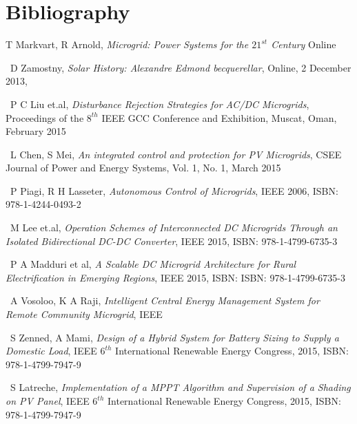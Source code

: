 \documentclass[journal,twoside]{IEEEtran}
\begin{document}
\section*{Bibliography}
\begin{thebibliography}{99}

        T Markvart, R Arnold, 
        \emph{Microgrid: Power Systems for the $21^{st}$ Century} 
        \lbrack Online \rbrack [Available:http://www.ingenia.org.uk/ingenia/articles.aspx?Index=329]

        ~D Zamostny, \emph{Solar History: Alexandre Edmond
        becquerellar}, \lbrack Online\rbrack, 2 December 2013,

        ~P C Liu et.al, \emph{Disturbance Rejection Strategies
        for AC/DC Microgrids}, Proceedings of the $8^{th}$ 
        IEEE GCC Conference and Exhibition, Muscat,
        Oman, February 2015

        ~L Chen, S Mei, \emph{An integrated control and
        protection for PV Microgrids}, CSEE Journal of
        Power and Energy Systems, Vol. 1, No. 1, March
        2015

        ~P Piagi, R H Lasseter, \emph{Autonomous Control of
        Microgrids}, IEEE 2006, ISBN: 978-1-4244-0493-2

     ~M Lee et.al, \emph{Operation Schemes of
        Interconnected DC Microgrids Through an
        Isolated Bidirectional DC-DC Converter}, IEEE
        2015, ISBN: 978-1-4799-6735-3

        ~P A Madduri et al, \emph{A Scalable DC Microgrid
        Architecture for Rural Electrification in Emerging
        Regions}, IEEE 2015, ISBN: ISBN: 978-1-4799-6735-3

        ~A Vosoloo, K A Raji, \emph{Intelligent Central Energy
        Management System for Remote Community
        Microgrid}, IEEE

        ~S Zenned, A Mami, \emph{Design of a Hybrid System
        for Battery Sizing to Supply a Domestic Load},
        IEEE $6^{th}$ International Renewable Energy
        Congress, 2015, ISBN: 978-1-4799-7947-9
    
        ~S Latreche, \emph{Implementation of a MPPT
        Algorithm and Supervision of a Shading on PV
        Panel}, IEEE $6^{th}$ International Renewable Energy
        Congress, 2015, ISBN: 978-1-4799-7947-9


\end{thebibliography}
\end{document}
